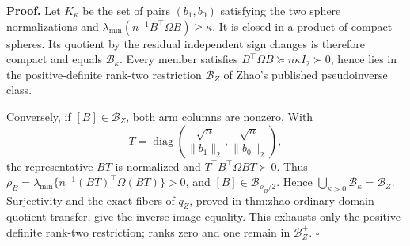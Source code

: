 \textbf{Proof.}
Let \(K_\kappa\) be the set of pairs \((b_1,b_0)\) satisfying the two sphere normalizations and \(\lambda_{\min}(n^{-1}B^\top\Omega B)\ge\kappa\).  It is closed in a product of compact spheres.  Its quotient by the residual independent sign changes is therefore compact and equals \(\mathcal B_\kappa\).  Every member satisfies \(B^\top\Omega B\succeq n\kappa I_2\succ0\), hence lies in the positive-definite rank-two restriction \(\mathcal B_Z\) of Zhao's published pseudoinverse class.

Conversely, if \([B]\in\mathcal B_Z\), both arm columns are nonzero.  With
\[
T=\operatorname{diag}\left(\frac{\sqrt n}{\lVert b_1\rVert_2},
\frac{\sqrt n}{\lVert b_0\rVert_2}\right),
\]
the representative \(BT\) is normalized and \(T^\top B^\top\Omega BT\succ0\).  Thus \(\rho_B=\lambda_{\min}\{n^{-1}(BT)^\top\Omega(BT)\}>0\), and \([B]\in\mathcal B_{\rho_B/2}\).  Hence \(\bigcup_{\kappa>0}\mathcal B_\kappa=\mathcal B_Z\).  Surjectivity and the exact fibers of \(q_Z\), proved in thm:zhao-ordinary-domain-quotient-transfer, give the inverse-image equality.  This exhausts only the positive-definite rank-two restriction; ranks zero and one remain in \(\mathcal B_Z^+\). \(\square\)
